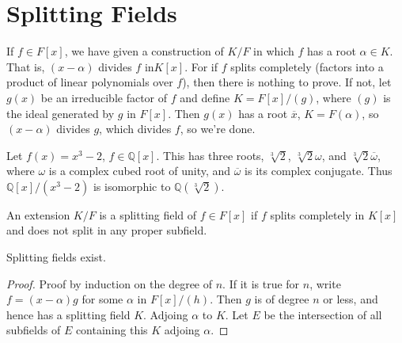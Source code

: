 \documentclass{article}                                                        %
\begin{document}
    \section{Splitting Fields}
        If $f\in{F}[x]$, we have given a construction of $K/F$ in which $f$ has
        a root $\alpha\in{K}$. That is, $(x-\alpha)$ divides $f$ in$ K[x]$. For
        if $f$ splits completely (factors into a product of linear polynomials
        over $f$), then there is nothing to prove. If not, let $g(x)$ be an
        irreducible factor of $f$ and define $K=F[x]/(g)$, where $(g)$ is the
        ideal generated by $g$ in $F[x]$. Then $g(x)$ has a root $\overline{x}$,
        $K=F(\alpha)$, so $(x-\alpha)$ divides $g$, which divides $f$, so we're
        done.
        \begin{example}
            Let $f(x)=x^{3}-2$, $f\in\mathbb{Q}[x]$. This has three roots,
            $\sqrt[3]{2}$, $\sqrt[3]{2}\omega$, and
            $\sqrt[3]{2}\overline{\omega}$, where $\omega$ is a complex cubed
            root of unity, and $\overline{\omega}$ is its complex conjugate.
            Thus $\mathbb{Q}[x]/(x^{3}-2)$ is isomorphic to
            $\mathbb{Q}(\sqrt[3]{2})$.
        \end{example}
        \begin{definition}
            An extension $K/F$ is a splitting field of $f\in{F}[x]$ if
            $f$ splits completely in $K[x]$ and does not split in any proper
            subfield.
        \end{definition}
        \begin{theorem}
            Splitting fields exist.
        \end{theorem}
        \begin{proof}
            Proof by induction on the degree of $n$. If it is true for $n$,
            write $f=(x-\alpha)g$ for some $\alpha$ in $F[x]/(h)$. Then
            $g$ is of degree $n$ or less, and hence has a splitting field
            $K$. Adjoing $\alpha$ to $K$. Let $E$ be the intersection of all
            subfields of $E$ containing this $K$ adjoing $\alpha$.
        \end{proof}
\end{document}
